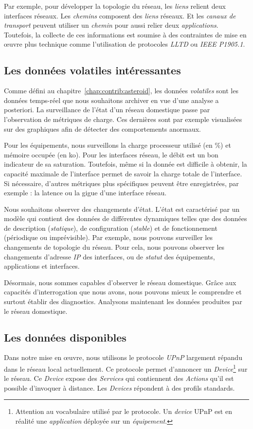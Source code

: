 Par exemple, pour développer la topologie du réseau, les \textit{liens} relient deux interfaces réseaux. Les \textit{chemins} composent des \textit{liens} réseaux. Et les \textit{canaux de transport} peuvent utiliser un \textit{chemin} pour aussi relier deux \textit{applications}. Toutefois, la collecte de ces informations est soumise à des contraintes de mise en œuvre plus technique comme l'utilisation de protocoles \textit{LLTD} ou \textit{IEEE P1905.1}.

\subsection{Les données volatiles intéressantes}
Comme défini au chapitre~\ref{chap:contrib:asteroid}, les données \textit{volatiles} sont les données temps-réel que nous souhaitons archiver en vue d'une analyse a posteriori. La surveillance de l'état d'un réseau domestique passe par l'observation de métriques de charge. Ces dernières sont par exemple visualisées sur des graphiques afin de détecter des comportements anormaux.

Pour les équipements, nous surveillons la charge processeur utilisé (en \%) et mémoire occupée (en ko). Pour les interfaces réseau, le débit est un bon indicateur de sa saturation. Toutefois, même si la donnée est difficile à obtenir, la capacité maximale de l'interface permet de savoir la charge totale de l'interface. Si nécessaire, d'autres métriques plus spécifiques peuvent être enregistrées, par exemple : la latence ou la gigue d'une interface réseau.


Nous souhaitons observer des changements d'état. L'état est caractérisé par un modèle qui contient des données de différentes dynamiques telles que des données de description (\textit{statique}), de configuration (\textit{stable}) et de fonctionnement (périodique ou imprévisible). Par exemple, nous pouvons surveiller les changements de topologie du réseau. Pour cela, nous pouvons observer les changements d'adresse \textit{IP} des interfaces, ou de \textit{statut} des équipements, applications et interfaces.

Désormais, nous sommes capables d'observer le réseau domestique. Grâce aux capacités d'interrogation que nous avons, nous pouvons mieux le comprendre et surtout établir des diagnostics. Analysons maintenant les données produites par le réseau domestique.

\subsection{Les données disponibles}\label{sec:valid:domvision:systeme:data}
Dans notre mise en œuvre, nous utilisons le protocole \textit{UPnP} largement répandu dans le réseau local actuellement. Ce protocole permet d'annoncer un \textit{Device}\footnote{Attention au vocabulaire utilisé par le protocole. Un \textit{device} UPnP est en réalité une \textit{application} déployée sur un \textit{équipement}.} sur le réseau. Ce \textit{Device} expose des \textit{Services} qui contiennent des \textit{Actions} qu'il est possible d'invoquer à distance. Les \textit{Devices} répondent à des profils standards.

